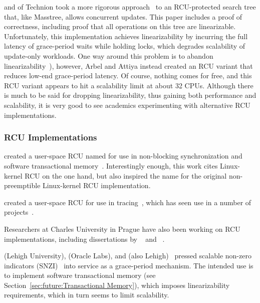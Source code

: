  and  of Technion took a more rigorous
approach~\cite{MayaArbel2014RCUtree} to an RCU-protected search tree that,
like Masstree, allows concurrent updates.
This paper includes a proof of correctness, including proof that all
operations on this tree are linearizable.
Unfortunately, this implementation achieves linearizability by incurring
the full latency of grace-period waits while holding locks, which degrades
scalability of update-only workloads.
One way around this problem is to abandon
linearizability~\cite{AndreasHaas2012FIFOisnt,PaulEMcKennneyAtomicTreeN4037}),
however, Arbel and Attiya instead created an RCU variant that reduces
low-end grace-period latency.
Of course, nothing comes for free, and this RCU variant appears to hit
a scalability limit at about 32 CPUs.
Although there is much to be said for dropping linearizability, thus
gaining both performance and scalability, it is very good to see academics
experimenting with alternative RCU implementations.

\subsubsection{RCU Implementations}
\label{sec:defer:RCU Implementations}

 created a user-space RCU named  for use in
non-blocking synchronization and software transactional
memory~\cite{KeirAnthonyFraserPhD,UCAM-CL-TR-579,KeirFraser2007withoutLocks}.
Interestingly enough, this work cites Linux-kernel RCU on the one hand,
but also inspired the name  for the original non-preemptible
Linux-kernel RCU implementation.

 created a user-space RCU for use in
tracing~\cite{MathieuDesnoyers2009URCU,MathieuDesnoyersPhD,MathieuDesnoyers2012URCU},
which has seen use in a number of projects~\cite{MikeDay2013RCUqemu}.

Researchers at Charles University in Prague have also been
working on RCU implementations, including dissertations by
~\cite{AndrejPodzimek2010masters} and
~\cite{AdamHraska2013RCUHelenOS}.

 (Lehigh University),  (Oracle Labs), and
 (also Lehigh)~\cite{Liu:2013:MSA:2549695.2549732}
pressed scalable non-zero indicators
(SNZI)~\cite{FaithEllen:2007:SNZI} into service as a grace-period
mechanism.
The intended use is to implement software transactional memory
(see Section~\ref{sec:future:Transactional Memory}), which
imposes linearizability requirements, which in turn seems to
limit scalability.

